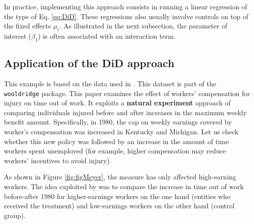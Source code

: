 \documentclass[
  12pt,
]{book}
\theoremstyle{definition}
\theoremstyle{definition}
\theoremstyle{definition}
\theoremstyle{definition}
\theoremstyle{remark}
\begin{document}
In practice, implementing this approach consists in running a linear regression of the type of Eq. \eqref{eq:DiD}. These regressions also usually involve controls on top of the fixed effects \(\mu_i\). As illustrated in the next subsection, the parameter of interest (\(\beta_1\)) is often associated with an interaction term.

\hypertarget{application-of-the-did-approach}{%
\subsection{Application of the DiD approach}\label{application-of-the-did-approach}}

This example is based on the data used in \citet{Meyer_Viscusi_Durbin_1995}. This dataset is part of the \texttt{wooldridge} package. This paper examines the effect of workers' compensation for injury on time out of work. It exploits a \textbf{natural experiment} approach of comparing individuals injured before and after increases in the maximum weekly benefit amount. Specifically, in 1980, the cap on weekly earnings covered by worker's compensation was increased in Kentucky and Michigan. Let us check whether this new policy was followed by an increase in the amount of time workers spent unemployed (for example, higher compensation may reduce workers' incentives to avoid injury).

As shown in Figure \ref{fig:figMeyer}, the measure has only affected high-earning workers. The idea exploited by \citet{Meyer_Viscusi_Durbin_1995} was to compare the increase in time out of work before-after 1980 for higher-earnings workers on the one hand (entities who received the treatment) and low-earnings workers on the other hand (control group).
\end{document}
